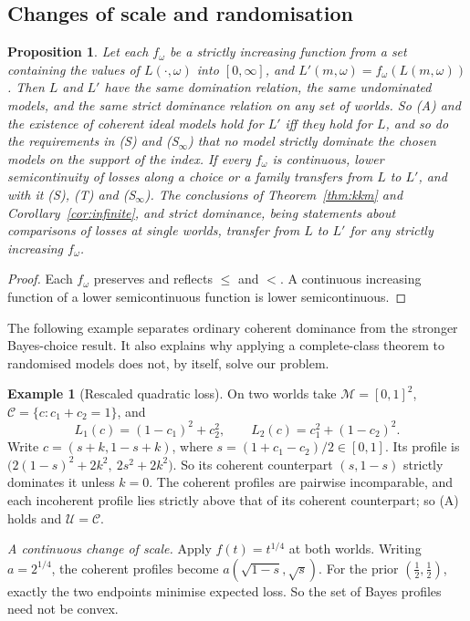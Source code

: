 \documentclass[11pt]{article}
\newtheorem{proposition}[theorem]{Proposition}
\theoremstyle{definition}
\newtheorem{example}[theorem]{Example}
\theoremstyle{remark}
\newcommand{\M}{\mathcal M}
\newcommand{\C}{\mathcal C}
\newcommand{\U}{\mathcal U}
\begin{document}
\subsection{Changes of scale and randomisation}\label{sec:ordinal}
\begin{proposition}\label{prop:ordinal}
Let each $f_\omega$ be a strictly increasing function from a set containing the values of $L(\cdot,\omega)$ into $[0,\infty]$, and $L'(m,\omega)=f_\omega(L(m,\omega))$. Then $L$ and $L'$ have the same domination relation, the same undominated models, and the same strict dominance relation on any set of worlds. So (A) and the existence of coherent ideal models hold for $L'$ iff they hold for $L$, and so do the requirements in (S) and (S$_\infty$) that no model strictly dominate the chosen models on the support of the index. If every $f_\omega$ is continuous, lower semicontinuity of losses along a choice or a family transfers from $L$ to $L'$, and with it (S), (T) and (S$_\infty$). The conclusions of Theorem~\ref{thm:kkm} and Corollary~\ref{cor:infinite}, and strict dominance, being statements about comparisons of losses at single worlds, transfer from $L$ to $L'$ for any strictly increasing $f_\omega$.
\end{proposition}
\begin{proof}
Each $f_\omega$ preserves and reflects $\le$ and $<$. A continuous increasing function of a lower semicontinuous function is lower semicontinuous.
\end{proof}

The following example separates ordinary coherent dominance from the stronger Bayes-choice result. It also explains why applying a complete-class theorem to randomised models does not, by itself, solve our problem.
\begin{example}[Rescaled quadratic loss]\label{ex:rescale}
On two worlds take $\M=[0,1]^2$, $\C=\{c:c_1+c_2=1\}$, and
\[
 L_1(c)=(1-c_1)^2+c_2^2,\qquad L_2(c)=c_1^2+(1-c_2)^2.
\]
Write $c=(s+k,1-s+k)$, where $s=(1+c_1-c_2)/2\in[0,1]$. Its profile is $\bigl(2(1-s)^2+2k^2,\ 2s^2+2k^2\bigr)$. So its coherent counterpart $(s,1-s)$ strictly dominates it unless $k=0$. The coherent profiles are pairwise incomparable, and each incoherent profile lies strictly above that of its coherent counterpart; so (A) holds and $\U=\C$.

\emph{A continuous change of scale.} Apply $f(t)=t^{1/4}$ at both worlds. Writing $a=2^{1/4}$, the coherent profiles become $a(\sqrt{1-s},\sqrt s)$. For the prior $(\tfrac12,\tfrac12)$, exactly the two endpoints minimise expected loss. So the set of Bayes profiles need not be convex.

\end{example}
\end{document}
